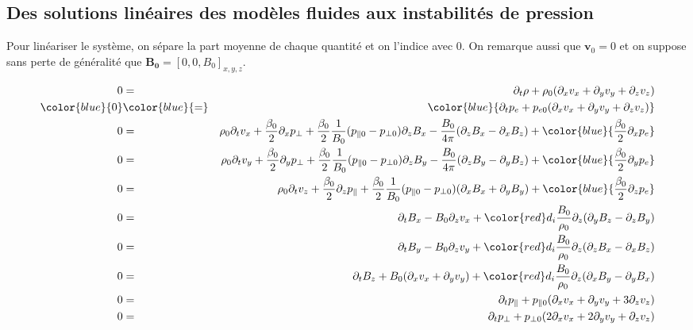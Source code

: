 \subsection{Des solutions linéaires des modèles fluides aux instabilités de pression}
\label{ssec-1113}

Pour linéariser le système, on sépare la part moyenne de chaque quantité et on l'indice avec 0. On remarque aussi que $\mathbf{v}_0 = 0$ et on suppose sans perte de généralité que $\mathbf{B_{0}} = [0,0,B_{0}]_{x,y,z}$. 

\begin{eqnarray}
 0 &=&  \partial_t \rho + \rho_0 (\partial_x v_x + \partial_y v_y + \partial_z v_z) \nonumber \\
  \color{blue}{0} & \color{blue}{=}& \color{blue}{ \partial_t p_{e} + p_{e0} (\partial_x v_x + \partial_y v_y + \partial_z v_z)}  \nonumber\\
 0 &=& \rho_0 \partial_t v_x + \frac{\beta_0}{2} \partial_x p_{\perp} + \frac{\beta_0}{2} \frac{1}{B_0}(p_{\parallel 0} - p_{\perp 0}) \partial_z B_x - \frac{B_0}{4\pi}(\partial_z B_x - \partial_x B_z) + \color{blue}{\frac{\beta_0}{2} \partial_x p_{e} } \nonumber\\
 0 &=& \rho_0 \partial_t v_y + \frac{\beta_0}{2} \partial_y p_{\perp} + \frac{\beta_0}{2} \frac{1}{B_0}(p_{\parallel 0} - p_{\perp 0}) \partial_z B_y - \frac{B_0}{4\pi}(\partial_z B_y - \partial_y B_z) + \color{blue}{\frac{\beta_0}{2} \partial_y p_{e} } \nonumber\\
 0 &=& \rho_0 \partial_t v_z + \frac{\beta_0}{2} \partial_z p_{\parallel} + \frac{\beta_0}{2} \frac{1}{B_0}(p_{\parallel 0} - p_{\perp 0}) (\partial_x B_x + \partial_y B_y) + \color{blue}{\frac{\beta_0}{2} \partial_z p_{e} }\nonumber\\ 
 0 &=& \partial_t B_x - B_0 \partial_z v_x  + {\color{red}d_i\frac{B_0 }{\rho_0} \partial_z (\partial_y B_z - \partial_z B_y) }\nonumber \\
 0 &=& \partial_t B_y - B_0 \partial_z v_y  + {\color{red}d_i\frac{B_0 }{\rho_0} \partial_z (\partial_z B_x - \partial_x B_z) }\nonumber \\
 0 &=& \partial_t B_z + B_0 (\partial_x v_x + \partial_y v_y)  + {\color{red}d_i \frac{B_0 }{\rho_0}\partial_z (\partial_x B_y   - \partial_y  B_x) } \nonumber\\
 0 &=& \partial_t p_{\parallel} + p_{\parallel 0}  (\partial_x v_x + \partial_y v_y + 3 \partial_z v_z) \nonumber\\
0 &=& \partial_t p_{\perp} + p_{\perp 0} (2\partial_x v_x + 2\partial_y v_y + \partial_z v_z) \nonumber
\end{eqnarray}

